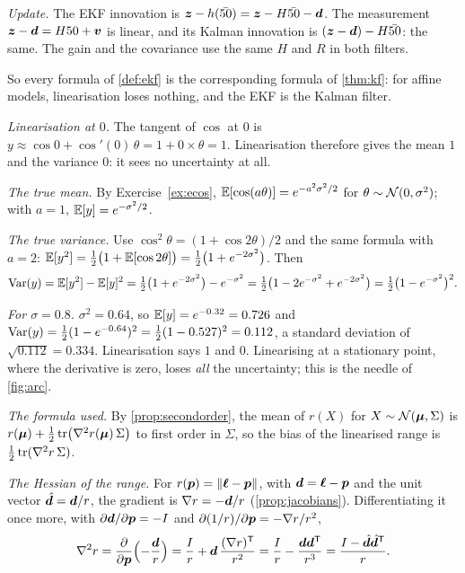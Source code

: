 \emph{Update.} The EKF innovation is $\bm{z}-h(\bar{50})=\bm{z}-H\bar{50}-\bm{d}$. The
measurement $\bm{z}-\bm{d}=H50+\bm{v}$ is linear, and its Kalman innovation is
$(\bm{z}-\bm{d})-H\bar{50}$: the same. The gain and the covariance use the same
$H$ and $R$ in both filters.

So every formula of \cref{def:ekf} is the corresponding formula of
\cref{thm:kf}: for affine models, linearisation loses nothing, and the
EKF is the Kalman filter.

 \emph{Linearisation at $0$.} The tangent of $\cos$ at $0$
is $y\approx\cos0+\cos'(0)\,\theta=1+0\times\theta=1$. Linearisation
therefore gives the mean $1$ and the variance $0$: it sees no uncertainty
at all.

\emph{The true mean.} By Exercise~\ref{ex:ecos},
$\mathbb{E}[\cos(a\theta)]=e^{-a^2\sigma^2/2}$ for $\theta\sim\mathcal{N}(0,
\sigma^2)$; with $a=1$, $\mathbb{E}[y]=e^{-\sigma^2/2}$.

\emph{The true variance.} Use $\cos^2\theta=(1+\cos2\theta)/2$ and the
same formula with $a=2$:
$\mathbb{E}[y^2]=\tfrac12\bigl(1+\mathbb{E}[\cos2\theta]\bigr)=\tfrac12\bigl(1+e^{-2
\sigma^2}\bigr)$. Then
\[
  \operatorname{Var}(y)=\mathbb{E}[y^2]-\mathbb{E}[y]^2=\tfrac12\bigl(1+e^{-2\sigma^2}\bigr)-e^{-\sigma^2}
  =\tfrac12\bigl(1-2e^{-\sigma^2}+e^{-2\sigma^2}\bigr)
  =\tfrac12\bigl(1-e^{-\sigma^2}\bigr)^2 .
\]

\emph{For $\sigma=0.8$.} $\sigma^2=0.64$, so
$\mathbb{E}[y]=e^{-0.32}=0.726$ and
$\operatorname{Var}(y)=\tfrac12(1-e^{-0.64})^2=\tfrac12(1-0.527)^2=0.112$, a standard
deviation of $\sqrt{0.112}=0.334$. Linearisation says $1$ and $0$.
Linearising at a stationary point, where the derivative is zero, loses
\emph{all} the uncertainty; this is the needle of \cref{fig:arc}.

 \emph{The formula used.} By \cref{prop:secondorder}, the
mean of $r(X)$ for $X\sim\mathcal{N}(\bm{\mu},\Sigma)$ is
$r(\bm{\mu})+\tfrac12\operatorname{tr}\bigl(\nabla^2r(\bm{\mu})\,\Sigma\bigr)$ to first order
in $\Sigma$, so the bias of the linearised range is
$\tfrac12\operatorname{tr}(\nabla^2r\,\Sigma)$.

\emph{The Hessian of the range.} For $r(\bm{p})=\left\lVert \bm{\ell}-\bm{p}\right\rVert$, with
$\bm{d}=\bm{\ell}-\bm{p}$ and the unit vector $\hat{\bm{d}}=\bm{d}/r$, the
gradient is $\nabla r=-\bm{d}/r$ (\cref{prop:jacobians}).
Differentiating it once more, with $\partial\bm{d}/\partial\bm{p}=-I$ and
$\partial(1/r)/\partial\bm{p}=-\nabla r/r^2$,
\[
  \nabla^2r=\frac{\partial}{\partial\bm{p}}\Bigl(-\frac{\bm{d}}{r}\Bigr)
  =\frac{I}{r}+\bm{d}\,\frac{(\nabla r)^{\mathsf{T}}}{r^2}
  =\frac{I}{r}-\frac{\bm{d}\bm{d}^{\mathsf{T}}}{r^3}
  =\frac{I-\hat{\bm{d}}\hat{\bm{d}}^{\mathsf{T}}}{r}.
\]

